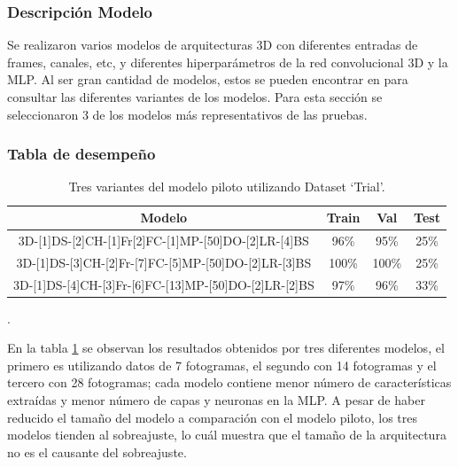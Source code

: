 \begin{onehalfspacing}
\subsubsection{Descripción Modelo}
\label{sec:DescripcionVariantesModeloPiloto}

Se realizaron varios modelos de arquitecturas 3D con diferentes entradas de frames, canales, etc, y diferentes hiperparámetros de la red convolucional 3D y la MLP. Al ser gran cantidad de modelos, estos se pueden encontrar en \cite{Mendieta2019} para consultar las diferentes variantes de los modelos.
Para esta sección se seleccionaron 3 de los modelos más representativos de las pruebas.\\





\subsubsection{Tabla de desempeño}
\label{sec:R_3DDNN-7-14-28F-MultiChannels FS}

\begin{table}[h!]
\centering
    \begin{tabular}{|c|c|c|c|}
        \hline 
        Modelo & Train & Val & Test\tabularnewline
        \hline 
        \hline 
        3D-{[}1{]}DS-{[}2{]}CH-{[}1{]}Fr{[}2{]}FC-{[}1{]}MP-{[}50{]}DO-{[}2{]}LR-{[}4{]}BS & 96\% & 95\% & 25\%\tabularnewline
        \hline 
        3D-{[}1{]}DS-{[}3{]}CH-{[}2{]}Fr-{[}7{]}FC-{[}5{]}MP-{[}50{]}DO-{[}2{]}LR-{[}3{]}BS & 100\% & 100\% & 25\%\tabularnewline
        \hline 
        3D-{[}1{]}DS-{[}4{]}CH-{[}3{]}Fr-{[}6{]}FC-{[}13{]}MP-{[}50{]}DO-{[}2{]}LR-{[}2{]}BS & 97\% & 96\% & 33\%\tabularnewline
        \hline 
    \end{tabular}
    \caption{\footnotesize  Tres variantes del modelo piloto utilizando Dataset `Trial'.}.
    \label{tab:RVariantesPiloto}
\end{table}

En la tabla \ref{tab:RVariantesPiloto} se observan los resultados obtenidos por tres diferentes modelos, el primero es utilizando datos de 7 fotogramas, el segundo con 14 fotogramas y el tercero con 28 fotogramas; cada modelo contiene menor número de características extraídas y menor número de capas y neuronas en la MLP. A pesar de haber reducido el tamaño del modelo a comparación con el modelo piloto, los tres modelos tienden al sobreajuste, lo cuál muestra que el tamaño de la arquitectura no es el causante del sobreajuste.\\


\end{onehalfspacing}

